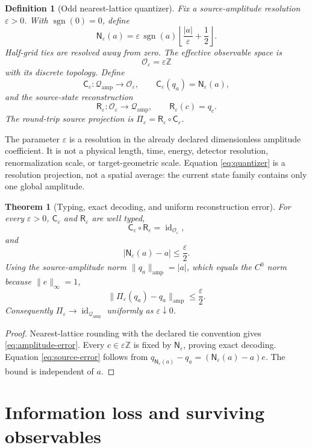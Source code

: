 \documentclass[11pt]{article}
\newcommand{\Qamp}{\mathcal Q_{\mathrm{amp}}}
\newcommand{\Oeps}{\mathcal O_\varepsilon}
\newcommand{\Ceps}{\mathsf C_\varepsilon}
\newcommand{\Reps}{\mathsf R_\varepsilon}
\newcommand{\Neps}{\mathsf N_\varepsilon}
\newtheorem{definition}{Definition}
\newtheorem{theorem}{Theorem}
\begin{document}
\begin{definition}[Odd nearest-lattice quantizer]
Fix a source-amplitude resolution \(\varepsilon>0\).  With
\(\operatorname{sgn}(0)=0\), define
\[
 \Neps(a)
 =\varepsilon\,\operatorname{sgn}(a)
   \left\lfloor\frac{|a|}{\varepsilon}+\frac12\right\rfloor.
 \label{eq:quantizer}
\]
Half-grid ties are resolved away from zero.  The effective observable space is
\[
 \Oeps=\varepsilon\mathbb Z
\]
with its discrete topology.  Define
\[
 \Ceps:\Qamp\longrightarrow\Oeps,\qquad
 \Ceps(q_a)=\Neps(a),
 \label{eq:coarse-map}
\]
and the source-state reconstruction
\[
 \Reps:\Oeps\longrightarrow\Qamp,\qquad
 \Reps(c)=q_c.
 \label{eq:reconstruction}
\]
The round-trip source projection is
\(\Pi_\varepsilon=\Reps\circ\Ceps\).
\end{definition}

The parameter \(\varepsilon\) is a resolution in the already declared
dimensionless amplitude coefficient.  It is not a physical length, time,
energy, detector resolution, renormalization scale, or target-geometric
scale.  Equation \eqref{eq:quantizer} is a resolution projection, not a
spatial average: the current state family contains only one global amplitude.

\begin{theorem}[Typing, exact decoding, and uniform reconstruction error]
\label{thm:error}
For every \(\varepsilon>0\), \(\Ceps\) and \(\Reps\) are well typed,
\[
 \Ceps\circ\Reps=\operatorname{id}_{\Oeps},
\]
and
\[
 |\Neps(a)-a|\leq\frac{\varepsilon}{2}.
 \label{eq:amplitude-error}
\]
Using the source-amplitude norm
\(\|q_a\|_{\mathrm{amp}}=|a|\), which equals the \(C^0\) norm because
\(\|e\|_\infty=1\),
\[
 \|\Pi_\varepsilon(q_a)-q_a\|_{\mathrm{amp}}
 \leq\frac{\varepsilon}{2}.
 \label{eq:source-error}
\]
Consequently \(\Pi_\varepsilon\to\operatorname{id}_{\Qamp}\) uniformly as
\(\varepsilon\downarrow0\).
\end{theorem}

\begin{proof}
Nearest-lattice rounding with the declared tie convention gives
\eqref{eq:amplitude-error}.  Every \(c\in\varepsilon\mathbb Z\) is fixed by
\(\Neps\), proving exact decoding.  Equation \eqref{eq:source-error} follows
from \(q_{\Neps(a)}-q_a=(\Neps(a)-a)e\).  The bound is independent of \(a\).
\end{proof}

\section{Information loss and surviving observables}
\end{document}
